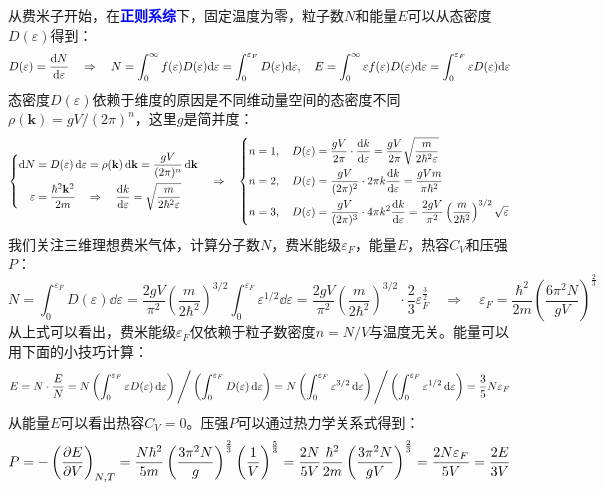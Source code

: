 从费米子开始，在\textcolor{blue}{\textbf{正则系综}}下，固定温度为零，粒子数$N$和能量$E$可以从态密度$D(\varepsilon)$得到：
\[D(\varepsilon)=\dv{N}{\varepsilon} \quad \Rightarrow \quad N=\int_0^{\infty} f(\varepsilon)D(\varepsilon)\dd\varepsilon=\int_0^{\varepsilon_F} D(\varepsilon)\dd\varepsilon, \quad E=\int_0^{\infty} \varepsilon f(\varepsilon)D(\varepsilon)\dd\varepsilon=\int_0^{\varepsilon_F} \varepsilon D(\varepsilon)\dd\varepsilon\]
态密度$D(\varepsilon)$依赖于维度的原因是不同维动量空间的态密度不同$\rho(\mathbf{k})=gV/(2\pi)^n$，这里$g$是简并度：
\[\left\{\begin{aligned}
\dd{N}&=D(\varepsilon)\dd{\varepsilon}=\rho(\mathbf{k})\dd{\mathbf{k}}=\frac{gV}{(2\pi)^n}\dd{\mathbf{k}}\\
\varepsilon&=\frac{\hbar^2\mathbf{k}^2}{2m}\quad \Rightarrow \quad \dv{k}{\varepsilon}=\sqrt{\frac{m}{2\hbar^2\varepsilon}}
\end{aligned}\right.
\quad \Rightarrow \quad \left\{\begin{aligned}
n=1, \quad D(\varepsilon)&=\frac{gV}{2\pi}\cdot\dv{k}{\varepsilon}=\frac{gV}{2\pi}\sqrt{\frac{m}{2\hbar^2\varepsilon}}\\
n=2, \quad D(\varepsilon)&=\frac{gV}{(2\pi)^2}\cdot2\pi k\dv{k}{\varepsilon}=\frac{gVm}{\pi\hbar^2}\\
n=3, \quad D(\varepsilon)&=\frac{gV}{(2\pi)^3}\cdot4\pi k^2\dv{k}{\varepsilon}=\frac{2gV}{\pi^2}\left(\frac{m}{2\hbar^2}\right)^{3/2}\sqrt{\varepsilon}
\end{aligned}\right.\]
我们关注三维理想费米气体，计算分子数$N$，费米能级$\varepsilon_F$，能量$E$，热容$C_V$和压强$P$：
\[N=\int_0^{\varepsilon_F} D(\varepsilon)\dd{\varepsilon}=\frac{2gV}{\pi^2}\left(\frac{m}{2\hbar^2}\right)^{3/2}\int_0^{\varepsilon_F} \varepsilon^{1/2}\dd{\varepsilon}=\frac{2gV}{\pi^2}\left(\frac{m}{2\hbar^2}\right)^{3/2}\cdot\frac{2}{3}\varepsilon_F^{\frac{3}{2}} \quad \Rightarrow \quad \boxed{\varepsilon_F=\frac{\hbar^2}{2m}\left(\frac{6\pi^2N}{gV}\right)^{\frac{2}{3}}}\]
从上式可以看出，费米能级$\varepsilon_F$仅依赖于粒子数密度$n=N/V$与温度无关。能量可以用下面的小技巧计算：
\[E=N\cdot\frac{E}{N}=N\left(\int_0^{\varepsilon_F} \varepsilon D(\varepsilon)\dd{\varepsilon}\right)\Bigg{/}\left(\int_0^{\varepsilon_F} D(\varepsilon)\dd{\varepsilon}\right)=N\left(\int_0^{\varepsilon_F} \varepsilon^{3/2}\dd{\varepsilon}\right)\Bigg{/}\left(\int_0^{\varepsilon_F} \varepsilon^{1/2}\dd{\varepsilon}\right)=\frac{3}{5}N\varepsilon_F\]
从能量$E$可以看出热容$C_V=0$。压强$P$可以通过热力学关系式得到：
\[P=-\left(\pdv{E}{V}\right)_{N,T}=\frac{N\hbar^2}{5m}\left(\frac{3\pi^2N}{g}\right)^{\frac{2}{3}}\left(\frac{1}{V}\right)^{\frac{5}{3}}=
\frac{2N}{5V}\frac{\hbar^2}{2m}\left(\frac{3\pi^2N}{gV}\right)^{\frac{2}{3}}=\frac{2N\varepsilon_F}{5V}=\frac{2E}{3V}\]

